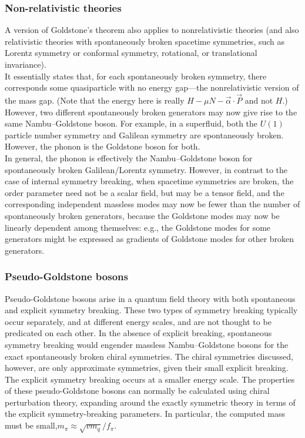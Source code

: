 \subsubsection{Non-relativistic theories}
A version of Goldstone's theorem also applies to nonrelativistic theories (and also relativistic theories with spontaneously broken spacetime symmetries, such as Lorentz symmetry or conformal symmetry, rotational, or translational invariance).\\
It essentially states that, for each spontaneously broken symmetry, there corresponds some quasiparticle with no energy gap—the nonrelativistic version of the mass gap. (Note that the energy here is really $H−\mu N−\vec{\alpha}\cdot \vec{P}$ and not $H$.) However, two different spontaneously broken generators may now give rise to the same Nambu–Goldstone boson. For example, in a superfluid, both the $U(1)$ particle number symmetry and Galilean symmetry are spontaneously broken. However, the phonon is the Goldstone boson for both.\\
In general, the phonon is effectively the Nambu–Goldstone boson for spontaneously broken Galilean/Lorentz symmetry. However, in contrast to the case of internal symmetry breaking, when spacetime symmetries are broken, the order parameter need not be a scalar field, but may be a tensor field, and the corresponding independent massless modes may now be fewer than the number of spontaneously broken generators, because the Goldstone modes may now be linearly dependent among themselves: e.g., the Goldstone modes for some generators might be expressed as gradients of Goldstone modes for other broken generators.
\subsubsection{Pseudo-Goldstone bosons}
Pseudo-Goldstone bosons arise in a quantum field theory with both spontaneous and explicit symmetry breaking. These two types of symmetry breaking typically occur separately, and at different energy scales, and are not thought to be predicated on each other.
In the absence of explicit breaking, spontaneous symmetry breaking would engender massless Nambu–Goldstone bosons for the exact spontaneously broken chiral symmetries. The chiral symmetries discussed, however, are only approximate symmetries, given their small explicit breaking.
\\
The explicit symmetry breaking occurs at a smaller energy scale. The properties of these pseudo-Goldstone bosons can normally be calculated using chiral perturbation theory, expanding around the exactly symmetric theory in terms of the explicit symmetry-breaking parameters. In particular, the computed mass must be small,$m_\pi \approx \sqrt{v m_q}/f_\pi$.

